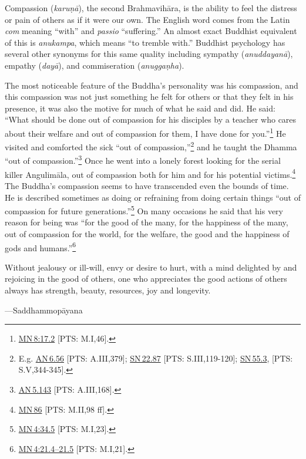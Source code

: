 \documentclass[10pt, openright]{book}
\newenvironment{epigram-2}%
{%
\setstretch{1.4}
\vspace{1em}
\noindent
\quoting[leftmargin=2cm,rightmargin=2cm]%
\begin{itshape}
\large
}%
{\end{itshape}\endquoting
}%
\newenvironment{epigram-2-cite}%
{%
\quoting[leftmargin=2cm,rightmargin=2cm]%
\noindent\normal\hspace*{\fill} 
}%
{\endquoting
}%
\begin{document}
Compassion (\textit{karuṇā}), the second Brahmavihāra, is the ability to feel the distress or pain of others as if it were our own. The English word comes from the Latin \textit{com} meaning “with” and \textit{passio} “suffering.” An almost exact Buddhist equivalent of this is \textit{anukampa}, which means “to tremble with.” Buddhist psychology has several other synonyms for this same quality including sympathy (\textit{anuddayanā}), empathy (\textit{dayā}), and commiseration (\textit{anuggaṇha}).


The most noticeable feature of the Buddha’s personality was his compassion, and this compassion was not just something he felt for others or that they felt in his presence, it was also the motive for much of what he said and did. He said: “What should be done out of compassion for his disciples by a teacher who cares about their welfare and out of compassion for them, I have done for you.”\footnote {\href{https://suttacentral.net/mn8/en/sujato\#17.2}{MN 8:17.2} [PTS: M.I,46].} He visited and comforted the sick “out of compassion,”\footnote {E.g. \href{https://suttacentral.net/an6.56/en/sujato}{AN 6.56} [PTS: A.III,379]; \href{https://suttacentral.net/sn22.87/en/sujato}{SN 22.87} [PTS: S.III,119-120]; \href{https://suttacentral.net/sn55.3/en/sujato}{SN 55.3}, [PTS: S.V,344-345].} and he taught the Dhamma “out of compassion.”\footnote {\href{https://suttacentral.net/an5.143/en/sujato}{AN 5.143} [PTS: A.III,168].} Once he went into a lonely forest looking for the serial killer Angulimāla, out of compassion both for him and for his potential victims.\footnote {\href{https://suttacentral.net/mn86/en/sujato}{MN 86} [PTS: M.II,98 ff].} The Buddha’s compassion seems to have transcended even the bounds of time. He is described sometimes as doing or refraining from doing certain things “out of compassion for future generations.”\footnote {\href{https://suttacentral.net/mn4/en/sujato\#34.5}{MN 4:34.5} [PTS: M.I,23].} On many occasions he said that his very reason for being was “for the good of the many, for the happiness of the many, out of compassion for the world, for the welfare, the good and the happiness of gods and humans.”\footnote {\href{https://suttacentral.net/mn4/en/sujato\#21.4}{MN 4:21.4–21.5} [PTS: M.I,21].}


\begin{epigram-2}
Without jealousy or ill-will, envy or desire to hurt, with a mind delighted by and rejoicing in the good of others, one who appreciates the good actions of others always has strength, beauty, resources, joy and longevity.
\end{epigram-2}
\begin{epigram-2-cite}
—Saddhammopāyana
\end{epigram-2-cite}
\end{document}
